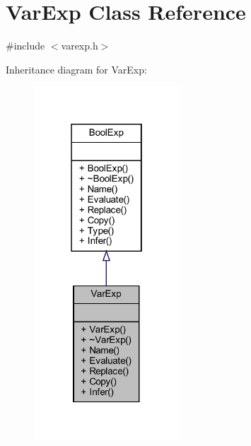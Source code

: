 \hypertarget{classVarExp}{}\section{Var\+Exp Class Reference}
\label{classVarExp}


{\ttfamily \#include $<$varexp.\+h$>$}



Inheritance diagram for Var\+Exp\+:
\nopagebreak
\begin{figure}[H]
\begin{center}
\leavevmode
\includegraphics[width=154pt]{classVarExp__inherit__graph}
\end{center}
\end{figure}


